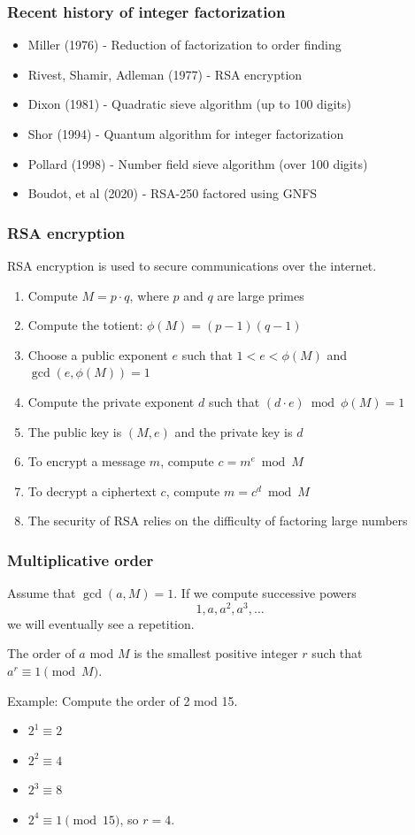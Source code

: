 \documentclass{beamer}
\begin{document}
\begin{frame}
\frametitle{Recent history of integer factorization}
\begin{itemize}

\item Miller (1976) - Reduction of factorization to order finding
\item Rivest, Shamir, Adleman (1977) - RSA encryption
\item Dixon (1981) - Quadratic sieve algorithm (up to 100 digits)
\item Shor (1994) - Quantum algorithm for integer factorization
\item Pollard (1998) - Number field sieve algorithm (over 100 digits)
\item Boudot, et al (2020) - RSA-250 factored using GNFS
\end{itemize}
\end{frame}

\begin{frame}
\frametitle{RSA encryption}

RSA encryption is used to secure communications over the internet.

\begin{enumerate}
    \item Compute $M = p \cdot q$, where $p$ and $q$ are large primes
    \item Compute the totient: $\phi(M) = (p-1)(q-1)$
    \item Choose a public exponent $e$ such that $1 < e < \phi(M)$ and $\gcd(e, \phi(M)) = 1$
    \item Compute the private exponent $d$ such that $(d \cdot e) \bmod{\phi(M)} = 1$
    \item The public key is $(M, e)$ and the private key is $d$
    \item To encrypt a message $m$, compute $c = m^e \bmod{M}$
    \item To decrypt a ciphertext $c$, compute $m = c^d \bmod{M}$
    \item The security of RSA relies on the difficulty of factoring large numbers
\end{enumerate}
\end{frame}

\begin{frame}
\frametitle{Multiplicative order}
Assume that $\gcd(a, M) = 1$. 
If we compute successive powers 
$$1, a, a^2, a^3, \ldots$$
we will eventually see a repetition.

The order of $a$ mod $M$ is the smallest positive 
integer $r$ such that $a^r \equiv 1 \pmod{M}$.

Example: Compute the order of 2 mod 15.
\begin{itemize}
    \item $2^1 \equiv 2$
    \item $2^2 \equiv 4$
    \item $2^3 \equiv 8$
    \item $2^4 \equiv 1 \pmod{15}$, so $r = 4$.
\end{itemize}

\end{frame}
\end{document}
